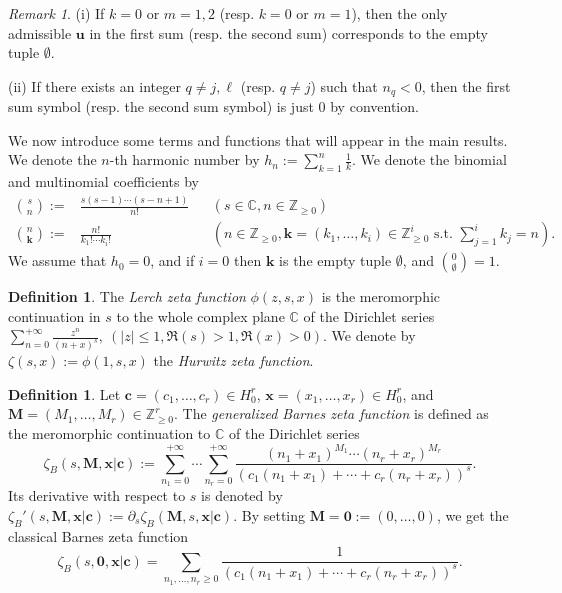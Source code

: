 \documentclass[a4paper]{amsart}
\theoremstyle{remark}
\newtheorem{remark}[theorem]{Remark}
\theoremstyle{definition}
\newtheorem{definition}[theorem]{Definition}
\begin{document}
\begin{remark}
(i) If $k=0$ or $m=1,2$ (resp. $k=0$ or $m=1$), then the only admissible $\mathbf{u}$ in the first sum (resp. the second sum) corresponds to the empty tuple $\emptyset$.

(ii) If there exists an integer $q \neq j,\ell$ (resp. $q \neq j$) such that $n_q<0$, then the first sum symbol (resp. the second sum symbol) is just $0$ by convention.
\end{remark}

We now introduce some terms and functions that will appear in the main results. We denote the $n$-th harmonic number by $h_n := \sum_{k=1}^n \frac{1}{k}$. We denote the binomial and multinomial coefficients by
\begin{align*}
    \binom{s}{n} :=& \frac{s(s-1)\cdots(s-n+1)}{n!} &&(s \in \mathbb{C}, n \in \mathbb{Z}_{\geq 0}) \\
    \binom{n}{\mathbf{k}} :=& \frac{n!}{k_1!\cdots k_i!} &&(n \in \mathbb{Z}_{\geq 0}, \mathbf{k}=(k_1,\ldots,k_i) \in \mathbb{Z}^i_{\geq 0} \text{ s.t. } \sum_{j=1}^i k_j=n).
\end{align*}
We assume that $h_0=0$, and if $i=0$ then $\mathbf{k}$ is the empty tuple $\emptyset$, and $\binom{0}{\emptyset} = 1$.

\begin{definition}
The \textit{Lerch zeta function} $\phi(z,s,x)$ is the meromorphic continuation in $s$ to the whole complex plane $\mathbb{C}$ of the Dirichlet series $\sum_{n=0}^{+\infty} \frac{z^n}{(n+x)^s}, \ (|z| \leq 1, \Re(s)>1, \Re(x)>0)$. We denote by $\zeta(s,x):=\phi(1,s,x)$ the \textit{Hurwitz zeta function}.
\end{definition}

\begin{definition}
Let $\mathbf{c}=(c_1,\ldots,c_r) \in H_0^r$, $\mathbf{x}=(x_1,\ldots,x_r) \in H_0^r$, and $\mathbf{M}=(M_1,\ldots,M_r) \in \mathbb{Z}_{\geq 0}^r$. The \textit{generalized Barnes zeta function} is defined as the meromorphic continuation to $\mathbb{C}$ of the Dirichlet series
\begin{equation}
    \zeta_B(s,\mathbf{M},\mathbf{x}|\mathbf{c}) := \sum_{n_1=0}^{+\infty} \cdots \sum_{n_r=0}^{+\infty} \frac{(n_1+x_1)^{M_1}\cdots(n_r+x_r)^{M_r}}{(c_1 (n_1+x_1) + \cdots + c_r(n_r+x_r))^s}. \label{eq:def_generalized_barnes}
\end{equation}
Its derivative with respect to $s$ is denoted by $\zeta_B'(s,\mathbf{M},\mathbf{x}|\mathbf{c}) := \partial_s \zeta_B(\mathbf{M},s,\mathbf{x}|\mathbf{c})$. By setting $\mathbf{M}=\mathbf{0}:=(0,\ldots,0)$, we get the classical Barnes zeta function
$$ \zeta_B(s,\mathbf{0},\mathbf{x}|\mathbf{c}) = \sum_{n_1,\ldots,n_{r} \geq 0} \frac{1}{(c_1 (n_1+x_1) + \cdots + c_r(n_r+x_r))^s}.$$
\end{definition}
\end{document}
